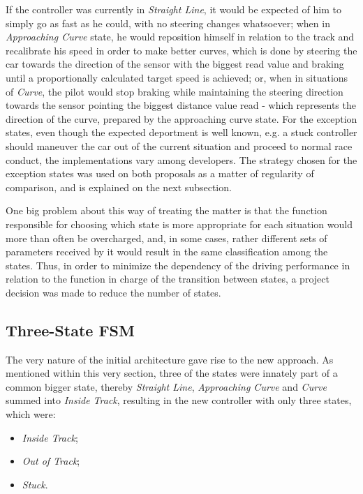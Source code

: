	If the controller was currently in \emph{Straight Line}, it would be expected of him to simply go as fast as he
	could, with no steering changes whatsoever; when in \emph{Approaching Curve} state, he would reposition himself
	in relation to the track and recalibrate his speed in order to make better curves, which is done by steering the
	car towards the direction of the sensor with the biggest read value and braking until a proportionally calculated
	target speed is achieved; or, when in situations of \emph{Curve}, the pilot would stop braking while maintaining
	the steering direction towards the sensor pointing the biggest distance value read - which represents the
	direction of the curve, prepared by the approaching curve state. For the exception states, even though the
	expected deportment is well known, e.g. a stuck controller should maneuver the car out of the current situation
	and proceed to normal race conduct, the implementations vary among developers. The strategy chosen for the
	exception states was used on both proposals as a matter of regularity of comparison, and is explained on the next
	subsection.
	
	One big problem about this way of treating the matter is that the function responsible for choosing which state
	is more appropriate for each situation would more than often be overcharged, and, in some cases, rather different
	sets of parameters received by it would result in the same classification among the states. Thus, in order to
	minimize the dependency of the driving performance in relation to the function in charge of the transition
	between states, a project decision was made to reduce the number of states.
		
\subsection{Three-State FSM} \label{subsec:FSM3}
	
	The very nature of the initial architecture gave rise to the new approach. As mentioned within this very section,
	three of the states were innately part of a common bigger state, thereby \emph{Straight Line},
	\emph{Approaching Curve} and \emph{Curve} summed into \emph{Inside Track}, resulting in the new controller with
	only three states, which were:
	
	\begin{itemize}
		
		\item \emph{Inside Track};
		
		\item \emph{Out of Track};
		
		\item \emph{Stuck}.
		
	\end{itemize}
	
